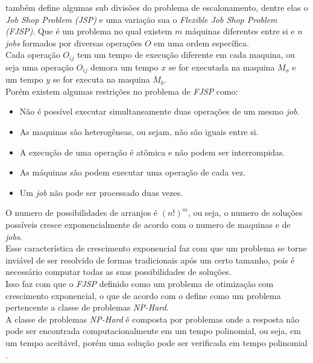 \citeauthor{Bagchi1999} também define algumas sub divisões do problema de escalonamento, dentre elas o \textit{Job Shop Problem} \textit{(JSP)} e uma variação sua o \textit{Flexible Job Shop Problem} \textit{(FJSP)}. 
Que é um problema no qual existem $m$ máquinas diferentes entre si e $n$ \textit{jobs} formados por diversas operações $O$ em uma ordem específica.\\
Cada operação $O_{ij}$ tem um tempo de execução diferente em cada maquina, ou seja uma operação 
$O_{ij}$ demora um tempo $x$ se for executada na maquina $M_a$ e um tempo $y$ se for executa na maquina $M_b$.\\
Porém existem algumas restrições no problema de \textit{FJSP} como:
\begin{itemize}
    \item Não é possível executar simultaneamente duas operações de um mesmo \textit{job}.
    \item As maquinas são heterogêneas, ou sejam, não são iguais entre si.
    \item A execução de uma operação é atômica e não podem ser interrompidas.
    \item As máquinas são podem executar uma operação de cada vez.
    \item Um \textit{job} não pode ser processado duas vezes.
\end{itemize}

O numero de possibilidades de arranjos é $(n!)^m$, ou seja, o numero de soluções possíveis cresce exponencialmente de acordo com o numero de maquinas e de \textit{jobs}.\\
Esse característica de crescimento exponencial faz com que um problema se torne inviável de ser resolvido de formas tradicionais após um certo tamanho, pois é necessário computar todas as suas possibilidades de soluções.\\
Isso faz com que o \textit{FJSP} definido como um problema de otimização com crescimento exponencial, o que de acordo com \citeauthor{Eswaramurthy2008} o define como um problema pertencente a classe de problemas \textit{NP-Hard}.\\
A classe de problemas \textit{NP-Hard} é composta por problemas onde a resposta não pode ser encontrada computacionalmente em um tempo polinomial, ou seja, em um tempo aceitável, porém uma solução pode ser verificada em tempo polinomial \cite{Eswaramurthy2008}.\\


